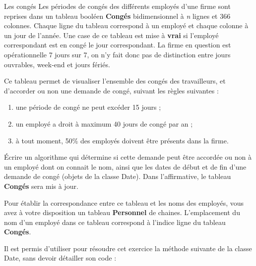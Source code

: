 \begin{Exercice}{Les congés}
	Les périodes de congés des différents employés d’une firme sont reprises
	dans un tableau booléen \textbf{Congés} bidimensionnel à \textit{n}
	lignes et 366 colonnes. Chaque ligne du tableau correspond à un employé
	et chaque colonne à un jour de l’année. Une case de ce tableau est mise
	à \textbf{vrai} si l’employé correspondant est en congé le jour
	correspondant. La firme en question est opérationnelle 7 jours sur 7,
	on n’y fait donc pas de distinction entre jours ouvrables, week-end et
	jours fériés.

	Ce tableau permet de visualiser l’ensemble des congés des travailleurs,
	et d’accorder ou non une demande de congé, suivant les règles suivantes :

	\begin{enumerate}
		\item 
			une période de congé ne peut excéder 15 jours ;
		\item 
			un employé a droit à maximum 40 jours de congé par an ;
		\item 
			à tout moment, 50\% des employés doivent être présents dans la firme.
	\end{enumerate}
	
	Écrire un algorithme qui détermine si cette demande peut être accordée
	ou non à un employé dont on connait le nom, ainsi que les dates de
	début et de fin d’une demande de congé (objets de la classe Date). Dans
	l’affirmative, le tableau \textbf{Congés} sera mis à jour.

	Pour établir la correspondance entre ce tableau et les noms des
	employés, vous avez à votre disposition un tableau \textbf{Personnel}
	de chaines. L’emplacement du nom d’un employé dans ce tableau
	correspond à l’indice ligne du tableau \textbf{Congés}.

	Il est permis d’utiliser pour résoudre cet exercice la méthode suivante
	de la classe Date, sans devoir détailler son code :
	
\end{Exercice}

